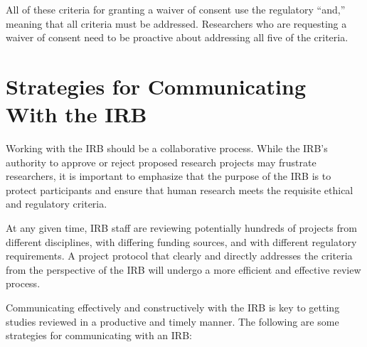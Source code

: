 \documentclass[
]{book}
\begin{document}
All of these criteria for granting a waiver of consent use the regulatory ``and,'' meaning that all criteria must be addressed. Researchers who are requesting a waiver of consent need to be proactive about addressing all five of the criteria.

\hypertarget{strategies-for-communicating-with-the-irb}{%
\section{Strategies for Communicating With the IRB}\label{strategies-for-communicating-with-the-irb}}

Working with the IRB should be a collaborative process. While the IRB's authority to approve or reject proposed research projects may frustrate researchers, it is important to emphasize that the purpose of the IRB is to protect participants and ensure that human research meets the requisite ethical and regulatory criteria.

At any given time, IRB staff are reviewing potentially hundreds of projects from different disciplines, with differing funding sources, and with different regulatory requirements. A project protocol that clearly and directly addresses the criteria from the perspective of the IRB will undergo a more efficient and effective review process.

Communicating effectively and constructively with the IRB is key to getting studies reviewed in a productive and timely manner. The following are some strategies for communicating with an IRB:
\end{document}
